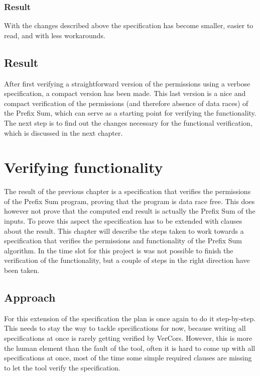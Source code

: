 \documentclass[a4paper]{article}
\begin{document}
\subsubsection{Result}
With the changes described above the specification has become smaller, easier to read, and with less workarounds.

\subsection{Result}
After first verifying a straightforward version of the permissions using a verbose specification, a compact version has been made. This last version is a nice and compact verification of the permissions (and therefore absence of data races) of the Prefix Sum, which can serve as a starting point for verifying the functionality. The next step is to find out the changes necessary for the functional verification, which is discussed in the next chapter.



\section{Verifying functionality}
The result of the previous chapter is a specification that verifies the permissions of the Prefix Sum program, proving that the program is data race free. This does however not prove that the computed end result is actually the Prefix Sum of the inputs. To prove this aspect the specification has to be extended with clauses about the result. This chapter will describe the steps taken to work towards a specification that verifies the permissions and functionality of the Prefix Sum algorithm. In the time slot for this project is was not possible to finish the verification of the functionality, but a couple of steps in the right direction have been taken.

\subsection{Approach}
For this extension of the specification the plan is once again to do it step-by-step. This needs to stay the way to tackle specifications for now, because writing all specifications at once is rarely getting verified by VerCors. However, this is more the human element than the fault of the tool, often it is hard to come up with all specifications at once, most of the time some simple required clauses are missing to let the tool verify the specification.
\end{document}
